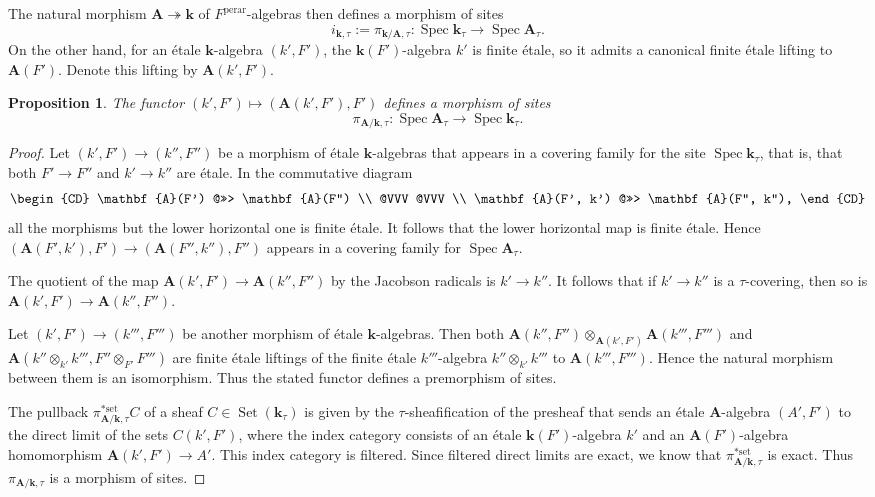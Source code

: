 \documentclass{amsart}
\newtheorem{Prop}[Thm]{Proposition}
\theoremstyle{remark}
\numberwithin{equation}{subsection}
\newcommand{\onto}{\twoheadrightarrow}
\newcommand{\tensor}{\mathbin{\otimes}}
\newcommand{\perar}{\mathrm{perar}}
\newcommand{\set}{\mathrm{set}}
\newcommand{\alg}[1]{\mathbf{#1}}
\DeclareMathOperator{\Spec}{Spec}
\DeclareMathOperator{\Set}{Set}
\begin{document}
The natural morphism $\alg{A} \onto \alg{k}$ of $F^{\perar}$-algebras then defines a morphism of sites
	\[
			i_{\alg{k}, \tau}
		:=
			\pi_{\alg{k} / \alg{A}, \tau}
		\colon
			\Spec \alg{k}_{\tau}
		\to
			\Spec \alg{A}_{\tau}.
	\]
On the other hand, for an \'etale $\alg{k}$-algebra $(k', F')$,
the $\alg{k}(F')$-algebra $k'$ is finite \'etale,
so it admits a canonical finite \'etale lifting to $\alg{A}(F')$.
Denote this lifting by $\alg{A}(k', F')$.

\begin{Prop}
	The functor $(k', F') \mapsto (\alg{A}(k', F'), F')$ defines a morphism of sites
		\[
				\pi_{\alg{A} / \alg{k}, \tau}
			\colon
				\Spec \alg{A}_{\tau}
			\to
				\Spec \alg{k}_{\tau}.
		\]
\end{Prop}

\begin{proof}
	Let $(k', F') \to (k'', F'')$ be a morphism of \'etale $\alg{k}$-algebras
	that appears in a covering family for the site $\Spec \alg{k}_{\tau}$,
	that is, that both $F' \to F''$ and $k' \to k''$ are \'etale.
	In the commutative diagram
		\[
			\begin{CD}
					\alg{A}(F')
				@>>>
					\alg{A}(F'')
				\\ @VVV @VVV \\
					\alg{A}(F', k')
				@>>>
					\alg{A}(F'', k''),
			\end{CD}
		\]
	all the morphisms but the lower horizontal one is finite \'etale.
	It follows that the lower horizontal map is finite \'etale.
	Hence $(\alg{A}(F', k'), F') \to (\alg{A}(F'', k''), F'')$ appears
	in a covering family for $\Spec \alg{A}_{\tau}$.
	
	The quotient of the map $\alg{A}(k', F') \to \alg{A}(k'', F'')$ by the Jacobson radicals
	is $k' \to k''$.
	It follows that if $k' \to k''$ is a $\tau$-covering,
	then so is $\alg{A}(k', F') \to \alg{A}(k'', F'')$.
	
	Let $(k', F') \to (k''', F''')$ be another morphism of \'etale $\alg{k}$-algebras.
	Then both $\alg{A}(k'', F'') \tensor_{\alg{A}(k', F')} \alg{A}(k''', F''')$
	and $\alg{A}(k'' \tensor_{k'} k''', F'' \tensor_{F'} F''')$
	are finite \'etale liftings of the finite \'etale $k'''$-algebra $k'' \tensor_{k'} k'''$
	to $\alg{A}(k''', F''')$.
	Hence the natural morphism between them is an isomorphism.
	Thus the stated functor defines a premorphism of sites.
	
	The pullback $\pi_{\alg{A} / \alg{k}, \tau}^{\ast \set} C$ of a sheaf $C \in \Set(\alg{k}_{\tau})$
	is given by the $\tau$-sheafification of the presheaf that sends
	an \'etale $\alg{A}$-algebra $(A', F')$ to the direct limit of the sets $C(k', F')$,
	where the index category consists of an \'etale $\alg{k}(F')$-algebra $k'$
	and an $\alg{A}(F')$-algebra homomorphism $\alg{A}(k', F') \to A'$.
	This index category is filtered.
	Since filtered direct limits are exact,
	we know that $\pi_{\alg{A} / \alg{k}, \tau}^{\ast \set}$ is exact.
	Thus $\pi_{\alg{A} / \alg{k}, \tau}$ is a morphism of sites.
\end{proof}
\end{document}
